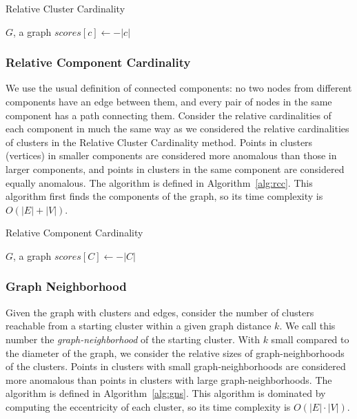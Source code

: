 \begin{algorithm}[h]
    \caption{Relative Cluster Cardinality}
    \label{alg:rclc}
\begin{algorithmic}[1]
    \REQUIRE $G$, a graph
    \STATE $scores[c] \gets -|c|$
    \ENDFOR
\end{algorithmic}
\end{algorithm}

\subsubsection{Relative Component Cardinality}
We use the usual definition of connected components:
no two nodes from different components have an edge between them, and
every pair of nodes in the same component has a path connecting them.
Consider the relative cardinalities of each component in much the same way as we considered the relative cardinalities of clusters in the Relative Cluster Cardinality method.
Points in clusters (vertices) in smaller components are considered more anomalous than those in larger components,
and points in clusters in the same component are considered equally anomalous.
The algorithm is defined in Algorithm~\ref{alg:rcc}.
This algorithm first finds the components of the graph, so its time complexity is $O(|E| + |V|)$.

\begin{algorithm}[h]
    \caption{Relative Component Cardinality}
    \label{alg:rcc}
\begin{algorithmic}[1]
    \REQUIRE $G$, a graph
        \STATE $scores[C] \gets -|C|$
    \ENDFOR
\end{algorithmic}
\end{algorithm}

\subsubsection{Graph Neighborhood}
Given the graph with clusters and edges, consider the number of clusters reachable from a starting cluster within a given graph distance $k$.
We call this number the \textit{graph-neighborhood} of the starting cluster.
With $k$ small compared to the diameter of the graph, we consider the relative sizes of graph-neighborhoods of the clusters.
Points in clusters with small graph-neighborhoods are considered more anomalous than points in clusters with large graph-neighborhoods.
The algorithm is defined in Algorithm~\ref{alg:gns}.
This algorithm is dominated by computing the eccentricity of each cluster, so its time complexity is $O(|E| \cdot |V|)$.

